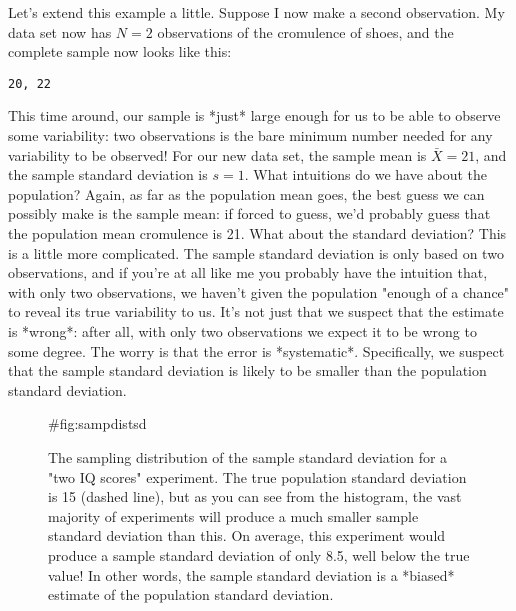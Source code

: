 Let's extend this example a little. Suppose I now make a second observation. My data set now has $N=2$ observations of the cromulence of shoes, and the complete sample now looks like this:
\begin{center}
\texttt{20, 22}
\end{center}
This time around, our sample is *just* large enough for us to be able to observe some variability: two observations is the bare minimum number needed for any variability to be observed! For our new data set, the sample mean is $\bar{X}=21$, and the sample standard deviation is $s=1$. What intuitions do we have about the population? Again, as far as the population mean goes, the best guess we can possibly make is the sample mean: if forced to guess, we'd probably guess that the population mean cromulence is 21. What about the standard deviation? This is a little more complicated. The sample standard deviation is only based on two observations, and if you're at all like me you probably have the intuition that, with only two observations, we haven't given the population "enough of a chance" to reveal its true variability to us. It's not just that we suspect that the estimate is *wrong*: after all, with only two observations we expect it to be wrong to some degree. The worry is that the error is *systematic*. Specifically, we suspect that the sample standard deviation is likely to be smaller than the population standard deviation. 

\begin{figure}[t]
\begin{center}
\caption{The sampling distribution of the sample standard deviation for a "two IQ scores" experiment. The true population standard deviation is 15 (dashed line), but as you can see from the histogram, the vast majority of experiments will produce a much smaller sample standard deviation than this. On average, this experiment would produce a sample standard deviation of only 8.5, well below the true value! In other words, the sample standard deviation is a *biased* estimate of the population standard deviation. }
{#fig:sampdistsd}
\HR
\end{center}
\end{figure}

